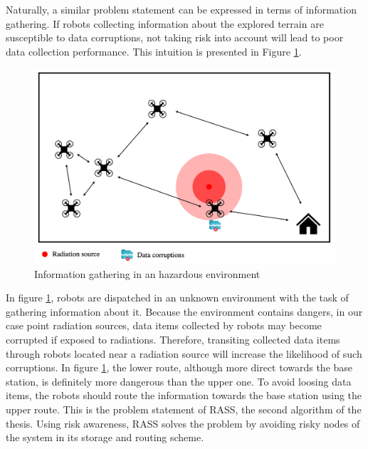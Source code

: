 

Naturally, a similar problem statement can be expressed in terms of information gathering. If robots collecting information about the explored terrain are susceptible to data corruptions, not taking risk into account will lead to poor data collection performance. This intuition is presented in Figure \ref{statementRASS}.

\begin{figure}[h]
	\centering
    \includegraphics[width=0.95\columnwidth]{images/statementRASS.png}
    \caption{Information gathering in an hazardous environment}
    \label{statementRASS}
\end{figure}

In figure \ref{statementRASS}, robots are dispatched in an unknown environment with the task of gathering information about it. Because the environment contains dangers, in our case point radiation sources, data items collected by robots may become corrupted if exposed to radiations. Therefore, transiting collected data items through robots located near a radiation source will increase the likelihood of such corruptions. In figure \ref{statementRASS}, the lower route, although more direct towards the base station, is definitely more dangerous than the upper one. To avoid loosing data items, the robots should route the information towards the base station using the upper route. This is the problem statement of RASS, the second algorithm of the thesis. Using risk awareness, RASS solves the problem by avoiding risky nodes of the system in its storage and routing scheme.




